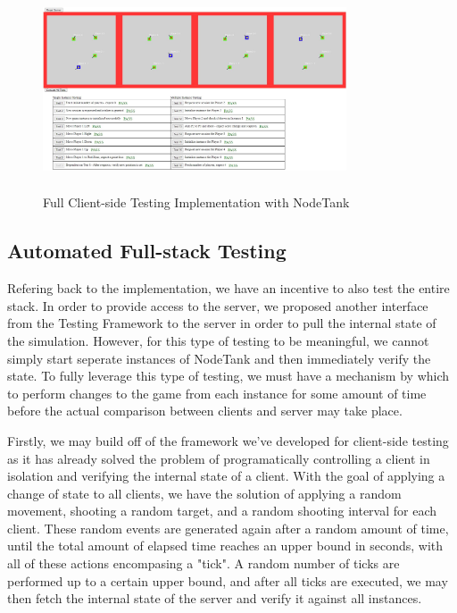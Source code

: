 \documentclass[conference]{IEEEtran}
\begin{document}
\begin{figure}[htbp]
\centerline{\includegraphics [width = 9cm, height = 6cm] {images/FullClientSideTesting.jpg}}
\caption{Full Client-side Testing Implementation with NodeTank}
\end{figure}

\subsection{Automated Full-stack Testing}

Refering back to the implementation, we have an incentive to also test the entire stack. In order to provide access to the server, we proposed another interface from the Testing Framework
to the server in order to pull the internal state of the simulation. However, for this type of testing to be meaningful, we cannot simply start seperate instances of NodeTank and then immediately 
verify the state. To fully leverage this type of testing, we must have a mechanism by which to perform changes to the game from each instance for some amount of time before the actual comparison 
between clients and server may take place. 

Firstly, we may build off of the framework we've developed for client-side testing as it has already solved the problem of programatically controlling a client in isolation and verifying the internal
state of a client. With the goal of applying a change of state to all clients, we have the solution of applying a random movement, shooting a random target, and a random shooting interval
for each client. These random events are generated again after a random amount of time, until the total amount of elapsed time reaches an upper bound in seconds, with all of these actions encompasing a "tick".
A random number of ticks are performed up to a certain upper bound, and after all ticks are executed, we may then fetch the internal state of the server and verify it against all instances. 
\end{document}
